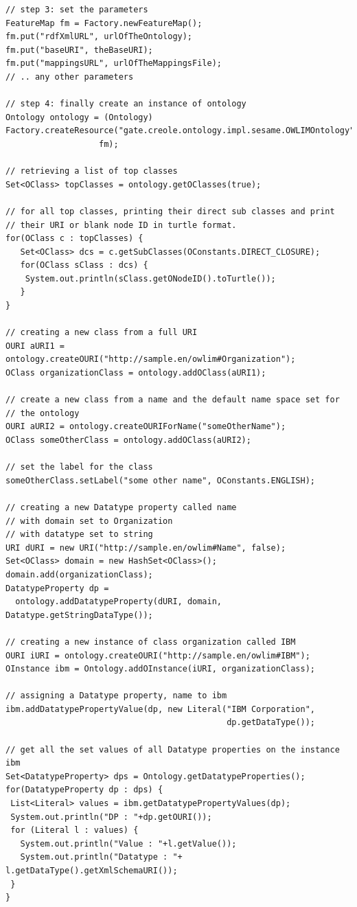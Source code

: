 {\begin{lstlisting}
// step 3: set the parameters
FeatureMap fm = Factory.newFeatureMap();
fm.put("rdfXmlURL", urlOfTheOntology);
fm.put("baseURI", theBaseURI);
fm.put("mappingsURL", urlOfTheMappingsFile);
// .. any other parameters

// step 4: finally create an instance of ontology
Ontology ontology = (Ontology)
Factory.createResource("gate.creole.ontology.impl.sesame.OWLIMOntology",
                   fm);

// retrieving a list of top classes
Set<OClass> topClasses = ontology.getOClasses(true);

// for all top classes, printing their direct sub classes and print 
// their URI or blank node ID in turtle format.
for(OClass c : topClasses) {
   Set<OClass> dcs = c.getSubClasses(OConstants.DIRECT_CLOSURE);
   for(OClass sClass : dcs) {
	System.out.println(sClass.getONodeID().toTurtle());
   }
}

// creating a new class from a full URI
OURI aURI1 = ontology.createOURI("http://sample.en/owlim#Organization");
OClass organizationClass = ontology.addOClass(aURI1);

// create a new class from a name and the default name space set for 
// the ontology
OURI aURI2 = ontology.createOURIForName("someOtherName");
OClass someOtherClass = ontology.addOClass(aURI2);

// set the label for the class
someOtherClass.setLabel("some other name", OConstants.ENGLISH);

// creating a new Datatype property called name
// with domain set to Organization
// with datatype set to string
URI dURI = new URI("http://sample.en/owlim#Name", false);
Set<OClass> domain = new HashSet<OClass>();
domain.add(organizationClass);
DatatypeProperty dp = 
  ontology.addDatatypeProperty(dURI, domain, Datatype.getStringDataType());

// creating a new instance of class organization called IBM
OURI iURI = ontology.createOURI("http://sample.en/owlim#IBM");
OInstance ibm = Ontology.addOInstance(iURI, organizationClass);

// assigning a Datatype property, name to ibm
ibm.addDatatypePropertyValue(dp, new Literal("IBM Corporation", 
											 dp.getDataType());

// get all the set values of all Datatype properties on the instance ibm
Set<DatatypeProperty> dps = Ontology.getDatatypeProperties();
for(DatatypeProperty dp : dps) {
 List<Literal> values = ibm.getDatatypePropertyValues(dp);
 System.out.println("DP : "+dp.getOURI());
 for (Literal l : values) {
   System.out.println("Value : "+l.getValue());
   System.out.println("Datatype : "+ l.getDataType().getXmlSchemaURI());
 }
}


\end{lstlisting}}

